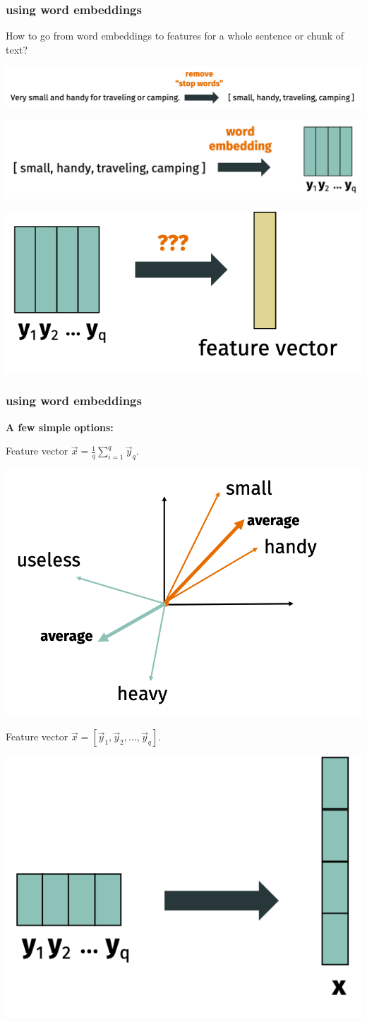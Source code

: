 \documentclass[handout,compress]{beamer}
\begin{document}
\begin{frame}
	\frametitle{using word embeddings}
	How to go from word embeddings to features for a whole sentence or chunk of text?
	\begin{center}
	\includegraphics[width=1\textwidth]{step1.png}
	
	\includegraphics[width=.7\textwidth]{step2.png}
	
	\includegraphics[width=.5\textwidth]{step3.png}
	\end{center}
\end{frame}

\begin{frame}
	\frametitle{using word embeddings}
	\textbf{A few simple options:} 
		\vspace{-.5em}
	
	Feature vector $\vec{x}= \frac{1}{q} \sum_{i=1}^q \vec{y}_q$. 
	\vspace{-1em}
	\begin{center}
		\includegraphics[width=.4\textwidth]{average_wordvec.png}
	\end{center}
	\vspace{-.5em}
	
	Feature vector $\vec{x}= [\vec{y}_1, \vec{y}_2, \ldots, \vec{y}_q]$. 
	\vspace{-1em}
	\begin{center}
		\includegraphics[width=.4\textwidth]{concat.png}
	\end{center}
\end{frame}
\end{document}
